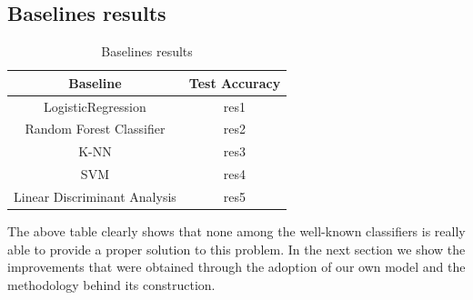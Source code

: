 \documentclass[10pt,conference,compsocconf]{IEEEtran}
\begin{document}
\subsection{Baselines results} 
\begin{table}
\caption{Baselines results}
\label{tab:baselineres}
\begin{tabular}{ | c | c | }
\hline
Baseline & Test Accuracy  \\
\hline
LogisticRegression & res1 \\
\hline
Random Forest Classifier & res2 \\
\hline
K-NN & res3 \\
\hline
SVM & res4 \\
\hline
Linear Discriminant Analysis & res5 \\
\hline
\end{tabular}
\end{table}
The above table clearly shows that none among the well-known classifiers is really able to provide a proper solution to this problem. In the next section we show the improvements that were obtained through the adoption of our own model and the methodology behind its construction. 
\end{document}
